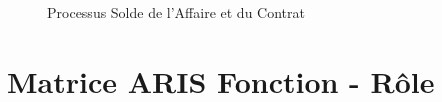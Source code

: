 \begin{figure}[H]
    \label{fig-solde-affaire}
    \noindent{}
    \caption{Processus Solde de l'Affaire et du Contrat}
\end{figure}


\chapter{Matrice ARIS Fonction - Rôle}

